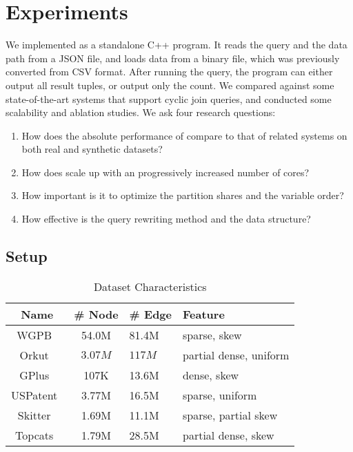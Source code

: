 \section{Experiments} \label{sec:exp}

We implemented \name as a standalone C++ program. It reads the query
and the data path from a JSON file, and loads data from a binary file,
which was previously converted from CSV format. After running the
query, the program can either output all result tuples, or output only
the count.  We compared \name against some state-of-the-art systems
that support cyclic join queries, and conducted some scalability and
ablation studies. We ask four research questions:

\begin{enumerate}
	\item How does the absolute performance of \name compare to that of related systems on both real and synthetic datasets?
	\item How does \name scale up with an progressively increased number of cores?
	\item How important is it to optimize the partition shares and the variable order?
	\item How effective is the query rewriting method and the \indexlayout data structure?
\end{enumerate}

\subsection{Setup}

{
\begin{table}[t]
	\caption{Dataset Characteristics}
	\label{tab:data}
	\begin{tabular}{ccll}
		\toprule
		Name & \# Node & \# Edge & Feature \\
		\midrule
		WGPB~\cite{wgpb-dataset, DBLP:conf/semweb/HoganRRS19} & 54.0M & 81.4M & sparse, skew   \\
		Orkut~\cite{DBLP:conf/imc/MisloveMGDB07} & $3.07M$ & $117M$ & partial dense, uniform  \\
		GPlus~\cite{DBLP:conf/nips/McAuleyL12} & 107K & 13.6M & dense, skew \\
		USPatent~\cite{DBLP:conf/kdd/LeskovecKF05} & 3.77M & 16.5M & sparse, uniform \\
		Skitter~\cite{DBLP:conf/kdd/LeskovecKF05} & 1.69M & 11.1M & sparse, partial skew \\
		Topcats~\cite{DBLP:conf/kdd/YinBLG17} & 1.79M & 28.5M & partial dense, skew \\
		\bottomrule
	\end{tabular}
\end{table}
}


